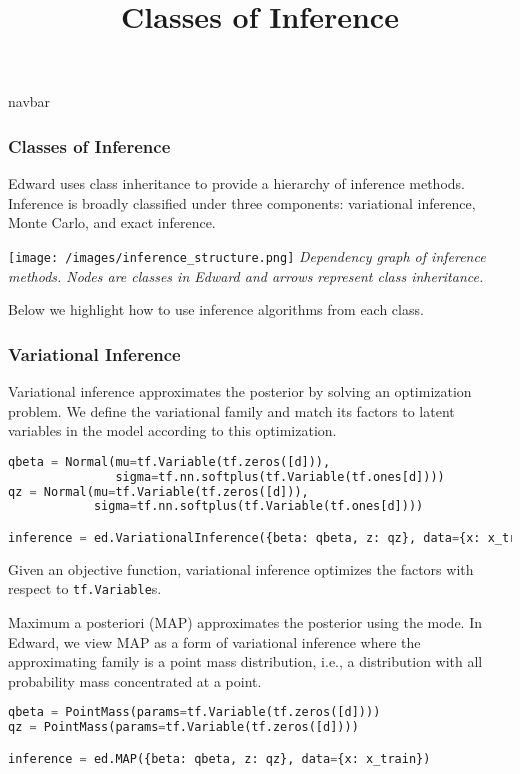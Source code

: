 \title{Classes of Inference}

{{navbar}}

\subsubsection{Classes of Inference}

Edward uses class inheritance to provide a hierarchy of inference
methods. Inference is broadly classified under three components:
variational inference, Monte Carlo, and exact inference.

\texttt{[image: /images/inference\_structure.png]}
{\small\textit{Dependency graph of inference methods.
Nodes are classes in Edward and arrows represent class inheritance.}}

Below we highlight how to use inference algorithms from each class.

\subsubsection{Variational Inference}


Variational inference approximates the posterior by solving an
optimization problem.  We define the variational family and match its
factors to latent variables in the model according to this
optimization.
\begin{lstlisting}[language=Python]
qbeta = Normal(mu=tf.Variable(tf.zeros([d])),
               sigma=tf.nn.softplus(tf.Variable(tf.ones[d])))
qz = Normal(mu=tf.Variable(tf.zeros([d])),
            sigma=tf.nn.softplus(tf.Variable(tf.ones[d])))

inference = ed.VariationalInference({beta: qbeta, z: qz}, data={x: x_train})
\end{lstlisting}
Given an objective function, variational inference optimizes the
factors with respect to \texttt{tf.Variable}s.

Maximum a posteriori (MAP) approximates the posterior using the mode.
In Edward, we view MAP as a form of variational
inference where the approximating family is a point mass distribution,
i.e., a distribution with all probability mass concentrated at a
point.
\begin{lstlisting}[language=Python]
qbeta = PointMass(params=tf.Variable(tf.zeros([d])))
qz = PointMass(params=tf.Variable(tf.zeros([d])))

inference = ed.MAP({beta: qbeta, z: qz}, data={x: x_train})
\end{lstlisting}


